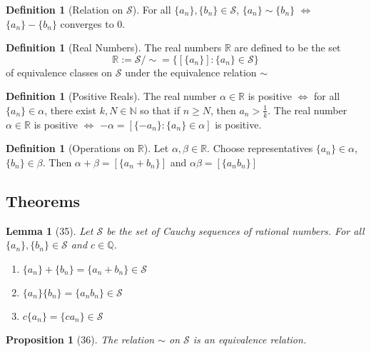 \documentclass[12pt]{article}
\newtheorem{lem}[thm]{Lemma}  %
\newtheorem{prop}[thm]{Proposition}
\theoremstyle{definition}
\newtheorem{defn}[thm]{Definition}
\theoremstyle{remark}
\numberwithin{equation}{section}
\newcommand\R{\mathbb R}    %
\newcommand\N{\mathbb N}    %
\newcommand\Q{\mathbb Q}    %
\begin{document}
\begin{defn}[Relation on $\mathcal{S}$]
        For all $\{a_n\},\{b_n\} \in \mathcal{S}$, $\{a_n\}\sim\{b_n\}$ $\iff$ $\{a_n\} - \{b_n\}$ converges to 0.
\end{defn}


\begin{defn}[Real Numbers]
        The real numbers $\R$ are defined to be the set $$\R:= \mathcal{S}/\sim = \{[\{a_n\}]:\{a_n\}\in\mathcal{S}\}$$ of equivalence classes on $\mathcal{S}$ under the equivalence relation $\sim$
\end{defn}




\begin{defn}[Positive Reals]
        The real number $\alpha \in \R$ is positive $\iff$ for all $\{a_n\} \in \alpha$, there exist $k,N \in \N$ so that if $n \geq N$, then $a_n > \frac{1}{k}$. The real number $\alpha \in \R$ is positive $\iff$ $-\alpha = [\{-a_n\}:\{a_n\} \in \alpha]$ is positive.
\end{defn}


\begin{defn}[Operations on $\R$]
        Let $\alpha,\beta \in \R$. Choose representatives $\{a_n\} \in \alpha$, $\{b_n\} \in \beta$. Then $\alpha + \beta = [\{a_n+b_n\}]$ and $\alpha\beta=[\{a_nb_n\}]$
\end{defn}




\subsection{Theorems}


\begin{lem}[35]
        Let $\mathcal{S}$ be the set of Cauchy sequences of rational numbers. For all $\{a_n\},\{b_n\} \in \mathcal{S}$ and $c \in \Q$.
        \begin{enumerate}
                \item $\{a_n\}+\{b_n\} = \{a_n+b_n\}\in \mathcal{S}$
                \item $\{a_n\}\{b_n\} = \{a_nb_n\} \in \mathcal{S}$
                \item $c\{a_n\} = \{ca_n\} \in \mathcal{S}$
        \end{enumerate}
\end{lem}


\begin{prop}[36]
        The relation $\sim$ on $\mathcal{S}$ is an equivalence relation.
\end{prop}
\end{document}
